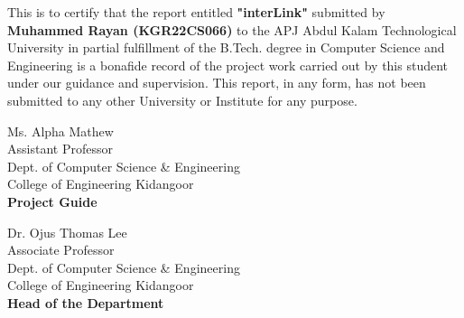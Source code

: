 \documentclass[twoside,a4paper,openright]{report} %
\begin{document}
This is to certify that the report entitled \textbf{\large "interLink"} submitted by \textbf{Muhammed Rayan (KGR22CS066)} to the APJ Abdul Kalam Technological University in partial fulfillment of the B.Tech. degree in Computer Science and Engineering is a bonafide record of the project work carried out by this student under our guidance and supervision. This report, in any form, has not been submitted to any other University or Institute for any purpose.


\vspace{1cm}  %

\noindent
\begin{minipage}{0.45\linewidth}
	\begin{flushleft}                         
		Ms. Alpha Mathew \\
		\footnotesize{Assistant Professor\\
			Dept. of Computer Science \& Engineering\\
			College of Engineering Kidangoor}\\
		\textbf{Project Guide} \\
	\end{flushleft}
\end{minipage}%
\hfill
\begin{minipage}{0.45\linewidth}
	\begin{flushright}                                       
		Dr. Ojus Thomas Lee \\
		\footnotesize{Associate Professor\\
			Dept. of Computer Science \& Engineering\\
			College of Engineering Kidangoor}\\
		\textbf{Head of the Department} \\
	\end{flushright}
\end{minipage}

\vspace{1cm} %
\end{document}
